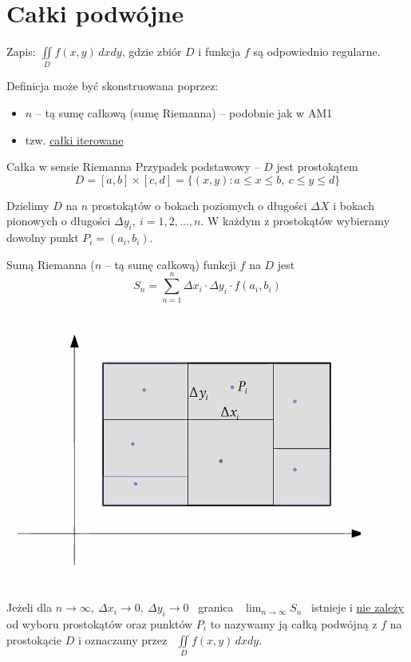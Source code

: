 \section{Całki podwójne}

Zapis: $ \iint\limits_{D} f(x,y)\, dxdy $, gdzie zbiór $D$ i funkcja $f$ są odpowiednio regularne.

Definicja może być skonstruowana poprzez:
\begin{itemize}
    \item $n$ -- tą sumę całkową (sumę Riemanna) -- podobnie jak w AM1
    \item tzw. \underline{całki iterowane}
\end{itemize}
\bigskip

\begin{tw}{Całka w sensie Riemanna}
Przypadek podstawowy -- $D$ jest prostokątem
\[ D = [a,b] \times [c,d] = \{ (x,y): a \leq x \leq b, \ c \leq y \leq d \} \]

Dzielimy $D$ na $n$ prostokątów o bokach poziomych o długości $\Delta X$ i bokach pionowych o długości $\Delta y_i, \ i = 1,2,...,n$.
W każdym z prostokątów wybieramy dowolny punkt $P_i = (a_i, b_i)$.

Sumą Riemanna ($n$ -- tą sumę całkową) funkcji $f$ na $D$ jest
\[ S_n = \sum\limits_{n=1}^{n} \Delta x_i \cdot \Delta y_i \cdot f(a_i, b_i) \]
\end{tw}

\begin{center}
    \includegraphics[scale=0.8]{img/prostokat1.png}
\end{center}

Jeżeli dla $ n \to \infty, \ \Delta x_i \to 0, \ \Delta y_i \to 0 $ \ granica \ $ \lim_{n \to \infty} S_n $ \ istnieje i \underline{nie zależy}
od wyboru prostokątów oraz punktów $P_i$ to nazywamy ją całką podwójną z $f$ na prostokącie $D$ i oznaczamy przez \ $ \iint\limits_D f(x,y) \, dxdy $.
\bigskip

